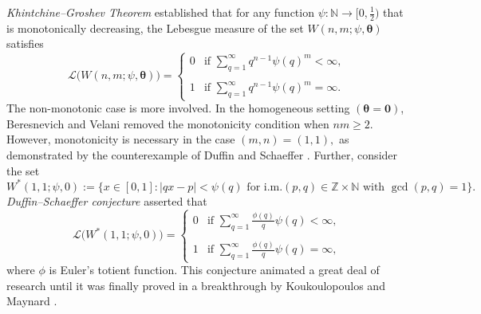\documentclass[12pt,a4paper,twoside]{article}
\begin{document}
 \medskip

{\em{%
Khintchine--Groshev Theorem}} \cite{G38,S64} established  that for any function $\psi\colon \mathbb{N}\to [0,\frac{1}{2})$ that is monotonically decreasing, the Lebesgue measure of the set $W(n,m;\psi,\bm{\theta})$ satisfies
\begin{equation*}
\mathcal{L}\big(W(n,m;\psi,\bm{\theta})\big)=\begin{cases}
   0   & \text{if $\sum_{q=1}^{\infty}q^{n-1}\psi(q)^{m}<\infty$}, \\
   ~&\\
    1  & \text{if $\sum_{q=1}^{\infty}q^{n-1}\psi(q)^{m}=\infty$}.
\end{cases}
\end{equation*}
The non-monotonic case is more involved.
In the homogeneous setting $(\bm{\theta}=\bm{0})$, Beresnevich and Velani \cite{BV10} removed the monotonicity condition when $nm\ge 2.$ However, monotonicity is necessary in the case $(m,n) = (1,1),$
as demonstrated by the counterexample of Duffin and Schaeffer \cite{DS41}.
Further,  consider the set
$$ {W}^{\ast}(1,1;\psi,0):=\Big\{x\in [0,1]\colon  |qx-p|<\psi(q)\text{ for i.m.} (p,q)\in \mathbb{Z}\times \mathbb{N} \text{ with } \gcd(p,q)=1\Big\}.$$
{\em{Duffin--Schaeffer conjecture}} asserted that
\begin{equation*}
\mathcal{L}\big(W^{\ast}(1,1;\psi,0)\big)=\begin{cases}
   0   & \text{if $\sum_{q=1}^{\infty}\frac{\phi(q)}{q}\psi(q)<\infty$}, \\
   ~&\\
    1  & \text{if $\sum_{q=1}^{\infty}\frac{\phi(q)}{q}\psi(q)=\infty$},
\end{cases}
\end{equation*}
where $\phi$ is Euler's totient function.
 This conjecture animated a great deal of research until it was finally proved in a breakthrough by Koukoulopoulos and Maynard \cite{KM20}.
\end{document}
